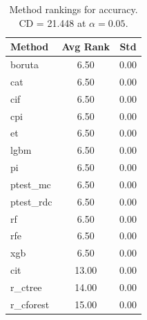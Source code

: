 \begin{table}[h]
\centering
\caption{Method rankings for accuracy. CD = 21.448 at $\alpha=0.05$.}
\label{tab:ranks_accuracy}
\begin{tabular}{lcc}
\toprule
Method & Avg Rank & Std \\
\midrule
boruta & 6.50 & 0.00 \\
cat & 6.50 & 0.00 \\
cif & 6.50 & 0.00 \\
cpi & 6.50 & 0.00 \\
et & 6.50 & 0.00 \\
lgbm & 6.50 & 0.00 \\
pi & 6.50 & 0.00 \\
ptest_mc & 6.50 & 0.00 \\
ptest_rdc & 6.50 & 0.00 \\
rf & 6.50 & 0.00 \\
rfe & 6.50 & 0.00 \\
xgb & 6.50 & 0.00 \\
cit & 13.00 & 0.00 \\
r_ctree & 14.00 & 0.00 \\
r_cforest & 15.00 & 0.00 \\
\bottomrule
\end{tabular}
\end{table}